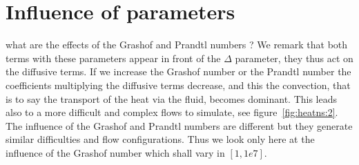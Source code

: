 




\section{Influence of parameters}
\label{sec:infl-des-param}


what are the effects of the Grashof and Prandtl numbers ? We remark
that both terms with these parameters appear in front of the $\Delta$
parameter, they thus act on the diffusive terms. If we increase the
Grashof number or the Prandtl number the coefficients multiplying the
diffusive terms decrease, and this the convection, that is to say the
transport of the heat via the fluid, becomes dominant. This leads also
to a more difficult and complex flows to simulate, see
figure~\ref{fig:heatns:2}. The influence of the Grashof and Prandtl
numbers are different but they generate similar difficulties and flow
configurations. Thus we look only here at the influence of the Grashof
number which shall vary in $[1, 1e7]$.

